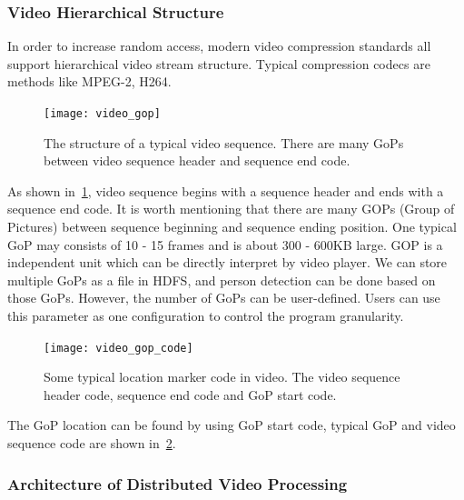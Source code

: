 \subsubsection{Video Hierarchical Structure}
In order to increase random access, modern video compression standards all
support hierarchical video stream structure. Typical compression codecs are  
methods like MPEG-2, H264.

\begin{figure}[!htbp]
  \centering
  \begin{minipage}{1.0\columnwidth}
  \texttt{[image: video\_gop]}
  \end{minipage}
  
  \vspace{-1ex}
  \caption
    {
    \small
    The structure of a typical video sequence. There are many GoPs between video
    sequence header and sequence end code.}
  \label{fig:video_gop}
\end{figure}

As shown in~\fig\ref{fig:video_gop}, video sequence begins with a sequence
header and ends with a sequence end code. It is worth mentioning that there are
many GOPs (Group of Pictures) between sequence beginning and sequence ending 
position. One typical GoP may consists of 10 - 15 frames and is about 300 -
600KB large.
GOP is a independent unit which can be directly interpret by video player. We
can store multiple GoPs as a file in HDFS, and person detection can be done
based on those GoPs. However, the number of GoPs can be user-defined. Users can
use this parameter as one configuration to control the program granularity.

\begin{figure}[!htbp]
  \centering
  \begin{minipage}{1.0\columnwidth}
  \texttt{[image: video\_gop\_code]}
  \end{minipage}
  
  \vspace{-1ex}
  \caption
    {
    \small
    Some typical location marker code in video. The video sequence header code,
    sequence end code and GoP start code. 
    }
  \label{fig:video_gop_code}
\end{figure}

The GoP location can be found by using GoP start code, typical GoP and video
sequence code are shown in~\fig\ref{fig:video_gop_code}. 


\subsubsection{Architecture of Distributed Video Processing}



